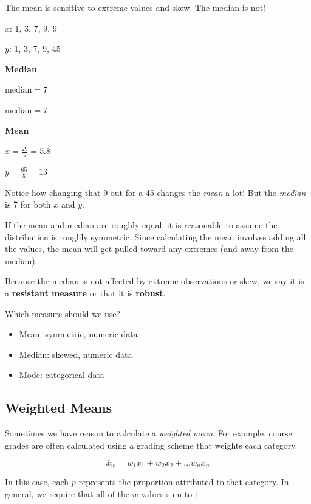 \documentclass[
]{book}
\providecommand{\tightlist}{%
  \setlength{\itemsep}{0pt}\setlength{\parskip}{0pt}}
\begin{document}
The mean is sensitive to extreme values and skew. The median is not!

\(x\): 1, 3, 7, 9, 9

\(y\): 1, 3, 7, 9, 45

\textbf{Median}

\(\text{median} = 7\)

\(\text{median} = 7\)

\textbf{Mean}

\(\bar{x} = \frac{29}{5} = 5.8\)

\(\bar{y} = \frac{65}{5} = 13\)

Notice how changing that 9 out for a 45 changes the \emph{mean} a lot! But the \emph{median} is 7 for both \(x\) and \(y\).

If the mean and median are roughly equal, it is reasonable to assume the distribution is roughly symmetric. Since calculating the mean involves adding all the values, the mean will get pulled toward any extremes (and away from the median).

Because the median is not affected by extreme observations or skew, we say it is a \textbf{resistant measure} or that it is \textbf{robust}.

Which measure should we use?

\begin{itemize}
\tightlist
\item
  Mean: symmetric, numeric data
\item
  Median: skewed, numeric data
\item
  Mode: categorical data
\end{itemize}

\subsection{Weighted Means}\label{weighted-means}

Sometimes we have reason to calculate a \emph{weighted mean}. For example, course grades are often calculated using a grading scheme that weights each category.

\[\bar{x}_w = w_1x_1 + w_2x_2 + \dots w_nx_n\]

In this case, each \(p\) represents the proportion attributed to that category. In general, we require that all of the \(w\) values sum to \(1\).
\end{document}
